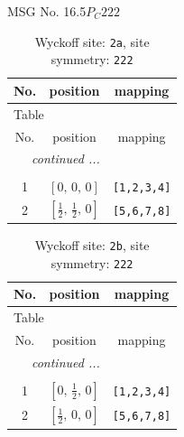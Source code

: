 \documentclass[fleqn,8pt]{jsarticle}
\begin{document}
\setcounter{MaxMatrixCols}{32}

\renewcommand{\tablename}{Table~}
\renewcommand{\figurename}{Figure~}
\begin{center}
\LARGE
MSG No. 16.5\quad$P_{C}222$
\end{center}
\renewcommand{\arraystretch}{1.2}
\begin{longtable}{ccc}
\caption{Wyckoff site: {\tt 2a}, site symmetry: {\tt 222}}
 \\
 \hline \hline
No. & position & mapping \\ \hline \endfirsthead

\multicolumn{2}{l}{\tablename\ \thetable{}} \\
 \hline \hline
No. & position & mapping \\ \hline \endhead

 \hline \hline
\multicolumn{2}{r}{\footnotesize\it continued ...} \\ \endfoot

 \hline \hline
\multicolumn{2}{r}{} \\ \endlastfoot

1 & $\left[ 0,\, 0,\, 0 \right]$ & {\tt [1,2,3,4]} \\ \hline
2 & $\left[ \frac{1}{2},\, \frac{1}{2},\, 0 \right]$ & {\tt [5,6,7,8]} \\
\end{longtable}
\renewcommand{\arraystretch}{1.2}
\begin{longtable}{ccc}
\caption{Wyckoff site: {\tt 2b}, site symmetry: {\tt 222}}
 \\
 \hline \hline
No. & position & mapping \\ \hline \endfirsthead

\multicolumn{2}{l}{\tablename\ \thetable{}} \\
 \hline \hline
No. & position & mapping \\ \hline \endhead

 \hline \hline
\multicolumn{2}{r}{\footnotesize\it continued ...} \\ \endfoot

 \hline \hline
\multicolumn{2}{r}{} \\ \endlastfoot

1 & $\left[ 0,\, \frac{1}{2},\, 0 \right]$ & {\tt [1,2,3,4]} \\ \hline
2 & $\left[ \frac{1}{2},\, 0,\, 0 \right]$ & {\tt [5,6,7,8]} \\
\end{longtable}
\renewcommand{\arraystretch}{1.2}
\end{document}
